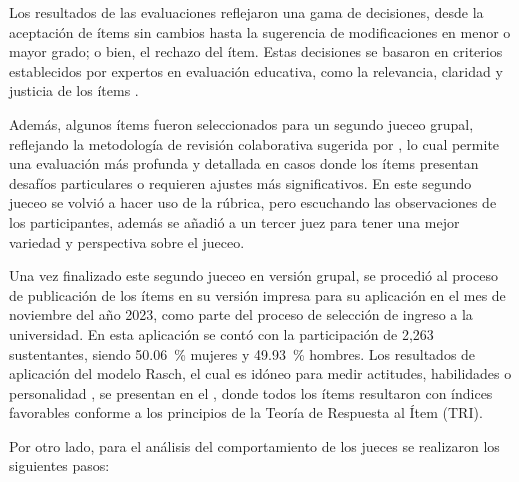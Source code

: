 Los resultados de las evaluaciones reflejaron una gama de decisiones,
desde la aceptación de ítems sin cambios hasta la sugerencia de
modificaciones en menor o mayor grado; o bien, el rechazo del ítem.
Estas decisiones se basaron en criterios establecidos por expertos en
evaluación educativa, como la relevancia, claridad y justicia de los
ítems \cite{Downing2003}.

Además, algunos ítems fueron seleccionados para un segundo jueceo
grupal, reflejando la metodología de revisión colaborativa sugerida por
\textcite{Stiggins2001}, lo cual permite una evaluación más profunda y detallada
en casos donde los ítems presentan desafíos particulares o requieren
ajustes más significativos. En este segundo jueceo se volvió a hacer uso
de la rúbrica, pero escuchando las observaciones de los participantes,
además se añadió a un tercer juez para tener una mejor variedad y
perspectiva sobre el jueceo.

Una vez finalizado este segundo jueceo en versión grupal, se procedió al
proceso de publicación de los ítems en su versión impresa para su
aplicación en el mes de noviembre del año 2023, como parte del proceso
de selección de ingreso a la universidad. En esta aplicación se contó
con la participación de 2,263 sustentantes, siendo 50.06~\% mujeres y
49.93~\% hombres. Los resultados de aplicación del modelo Rasch, el cual
es idóneo para medir actitudes, habilidades o personalidad
\cite{Tristan1998}, se presentan en el , donde todos los ítems
resultaron con índices favorables conforme a los principios de la Teoría
de Respuesta al Ítem (TRI).

Por otro lado, para el análisis del comportamiento de los jueces se
realizaron los siguientes pasos:

